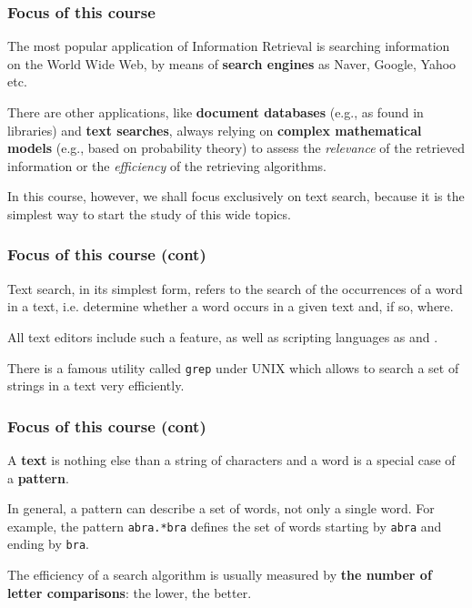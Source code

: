 
%
\begin{frame}
\frametitle{Focus of this course}

The most popular application of Information Retrieval is searching
information on the World Wide Web, by means of \textbf{search engines}
as Naver, Google, Yahoo etc.

\bigskip

There are other applications, like \textbf{document databases}
(e.g., as found in libraries) and \textbf{text searches}, always
relying on \textbf{complex mathematical models} (e.g., based on
probability theory) to assess the \emph{relevance} of the retrieved
information or the \emph{efficiency} of the retrieving algorithms.

\bigskip

In this course, however, we shall focus exclusively on text search,
because it is the simplest way to start the study of this wide topics.

\end{frame}

%
\begin{frame}[containsverbatim]
\frametitle{Focus of this course (cont)}

Text search, in its simplest form, refers to the search of the
occurrences of a word in a text, i.e. determine whether a word occurs
in a given text and, if so, where.

\bigskip

All text editors include such a feature, as well as scripting
languages as \Perl and \AWK.

\bigskip

There is a famous utility called \texttt{grep} under \textsc{UNIX}
which allows to search a set of strings in a text very efficiently.

\end{frame}

%
\begin{frame}[containsverbatim]
\frametitle{Focus of this course (cont)}

A \textbf{text} is nothing else than a string of characters and a
word is a special case of a \textbf{pattern}.

\bigskip

In general, a pattern can describe a set of words, not only a single
word. For example, the pattern \verb+abra.*bra+ defines the set of
words starting by \verb+abra+ and ending by \verb+bra+.

\bigskip

The efficiency of a search algorithm is usually measured by
\textbf{the number of letter comparisons}: the lower, the better.

\end{frame}
